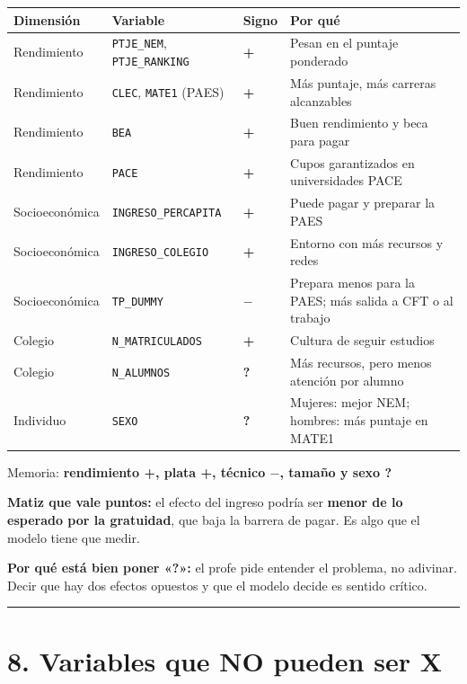 \documentclass[11pt]{article}
\begin{document}
\begin{tabularx}{\linewidth}{lllX}\toprule
\textbf{Dimensión} & \textbf{Variable} & \textbf{Signo} & \textbf{Por qué}\\ \midrule
Rendimiento & \texttt{PTJE\_NEM}, \texttt{PTJE\_RANKING} & \textbf{+} & Pesan en el puntaje ponderado\\
Rendimiento & \texttt{CLEC}, \texttt{MATE1} (PAES) & \textbf{+} & Más puntaje, más carreras alcanzables\\
Rendimiento & \texttt{BEA} & \textbf{+} & Buen rendimiento y beca para pagar\\
Rendimiento & \texttt{PACE} & \textbf{+} & Cupos garantizados en universidades PACE\\
Socioeconómica & \texttt{INGRESO\_PERCAPITA} & \textbf{+} & Puede pagar y preparar la PAES\\
Socioeconómica & \texttt{INGRESO\_COLEGIO} & \textbf{+} & Entorno con más recursos y redes\\
Socioeconómica & \texttt{TP\_DUMMY} & \textbf{$-$} & Prepara menos para la PAES; más salida a CFT o al trabajo\\
Colegio & \texttt{N\_MATRICULADOS} & \textbf{+} & Cultura de seguir estudios\\
Colegio & \texttt{N\_ALUMNOS} & \textbf{?} & Más recursos, pero menos atención por alumno\\
Individuo & \texttt{SEXO} & \textbf{?} & Mujeres: mejor NEM; hombres: más puntaje en MATE1\\
\bottomrule\end{tabularx}\medskip

Memoria: \textbf{rendimiento +, plata +, técnico $-$, tamaño y sexo ?}\par

\textbf{Matiz que vale puntos:} el efecto del ingreso podría ser \textbf{menor de lo esperado por la gratuidad}, que baja la barrera de pagar. Es algo que el modelo tiene que medir.\par

\textbf{Por qué está bien poner «?»:} el profe pide entender el problema, no adivinar. Decir que hay dos efectos opuestos y que el modelo decide es sentido crítico.\par

\medskip\hrule\medskip

\section*{8. Variables que NO pueden ser X}
\end{document}
